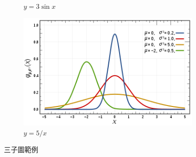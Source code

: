 \begin{figure}[!htb]
\begin{subfigure}[b]{0.3\textwidth}
        \caption{$y=3\sin x$}
        \label{fig:three sin x}
    \end{subfigure}
    \hfill
    \begin{subfigure}[b]{0.3\textwidth}
        \centering
        \includegraphics[width=\textwidth]{figures/gambar.png}
        \caption{$y=5/x$}
        \label{fig:five over x}
    \end{subfigure}
       \caption{三子圖範例}
       \label{fig:three graphs}
\end{figure}

